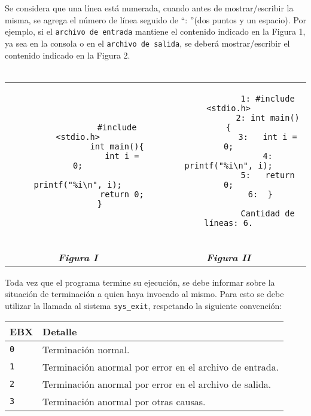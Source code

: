 \documentclass[12pt,a4paper]{article}
\begin{document}
Se considera que una línea está numerada, cuando antes de mostrar/escribir la misma, se agrega el número de línea seguido de ``: ''(dos puntos y un espacio). Por ejemplo, si el \texttt{archivo de entrada} mantiene el contenido indicado en la Figura 1, ya sea en la consola o en el \texttt{archivo de salida}, se deberá mostrar/escribir el contenido indicado en la Figura 2. \\ \\
\begin{centering}
	\begin{tabular}[t]{c|c}
		\begin{minipage}[t]{0.50\textwidth}
			\begin{verbatim}
				#include <stdio.h>
				int main(){
				  int i = 0;
				  printf("%i\n", i);
				  return 0;
				}		
			\end{verbatim}
		\end{minipage} &
		\begin{minipage}[t]{0.50\textwidth}
			\begin{verbatim}
				1: #include <stdio.h>
				2: int main(){
				3:   int i = 0;
				4:   printf("%i\n", i);
				5:   return 0;
				6:  }	
				
				Cantidad de líneas: 6.
				
			\end{verbatim}
		\end{minipage} \\
		\textbf{\textit{Figura I}} & \textbf{\textit{Figura II}}
	\end{tabular}
\end{centering}

Toda vez que el programa termine su ejecución, se debe informar sobre la situación de terminación a quien haya invocado al mismo. Para esto se debe utilizar la llamada al sistema \texttt{sys\_exit}, respetando la siguiente convención:
\begin{center}
	\begin{tabular}[t]{|l|l|}
		\hline \textbf{EBX} & \textbf{Detalle} \\ \hline
		\texttt{0} & Terminación normal. \\ \hline
		\texttt{1} & Terminación anormal por error en el archivo de entrada. \\ \hline
		\texttt{2} & Terminación anormal por error en el archivo de salida.\\ \hline
		\texttt{3} & Terminación anormal por otras causas.\\ \hline
	\end{tabular}
\end{center}
\end{document}
